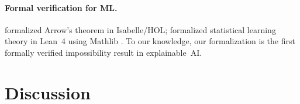 \documentclass{article}
\begin{document}
\paragraph{Formal verification for ML.}
\begin{sloppypar}
\citet{nipkow2009social} formalized Arrow's theorem in Isabelle/HOL; \citet{zhang2026statistical} formalized statistical learning theory in Lean~4 \citep{demoura2021lean4} using Mathlib \citep{mathlib2020}. To our knowledge, our formalization is the first formally verified impossibility result in explainable~AI.
\end{sloppypar}

\endgroup%

\section{Discussion}
\label{sec:discussion}
\end{document}
